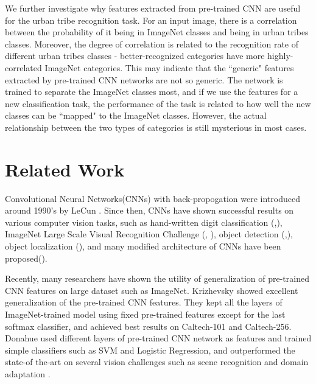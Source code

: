 \documentclass[10pt,twocolumn,letterpaper]{article}
\begin{document}
We further investigate why features extracted from pre-trained CNN are useful for the urban tribe recognition task. For an input image, there is a correlation between the probability of it being in ImageNet classes and being in urban tribes classes. Moreover, the degree of correlation is related to the recognition rate of different urban tribes classes - better-recognized categories have more highly-correlated ImageNet categories. This may indicate that the ``generic" features extracted by pre-trained CNN networks are not so generic. The network is trained to separate the ImageNet classes most, and if we use the features for a new classification task, the performance of the task is related to how well the new classes can be ``mapped" to the ImageNet classes. However, the actual relationship between the two types of categories is still mysterious in most cases.


\section{Related Work}

Convolutional Neural Networks(CNNs) with back-propogation were introduced around 1990's by LeCun \etal\cite{lecun89}.  Since then, CNNs have shown successful results on various computer vision tasks, such as hand-written digit classification (\cite{lecun98},\cite{maxout}), ImageNet Large Scale Visual Recognition Challenge (\cite{ImageNet}, \cite{googlenet}), object detection (\cite{overfeat},\cite{googlenet}), object localization (\cite{overfeat}), and many modified architecture of CNNs have been proposed(\cite{dropout}\cite{maxout}\cite{nin}).

Recently, many researchers have shown the utility of generalization of pre-trained CNN features on large dataset such as ImageNet. Krizhevsky \etal showed excellent generalization of the pre-trained CNN features\cite{ImageNet13}. They kept all the layers of ImageNet-trained model using fixed pre-trained features except for the last softmax classifier, and achieved best results on Caltech-101 and Caltech-256. Donahue \etal used different layers of pre-trained CNN network as features and trained simple classifiers such as SVM and Logistic Regression, and outperformed the state-of the-art on several vision challenges such as scene recognition and domain adaptation\cite{decaf} . 
\end{document}
